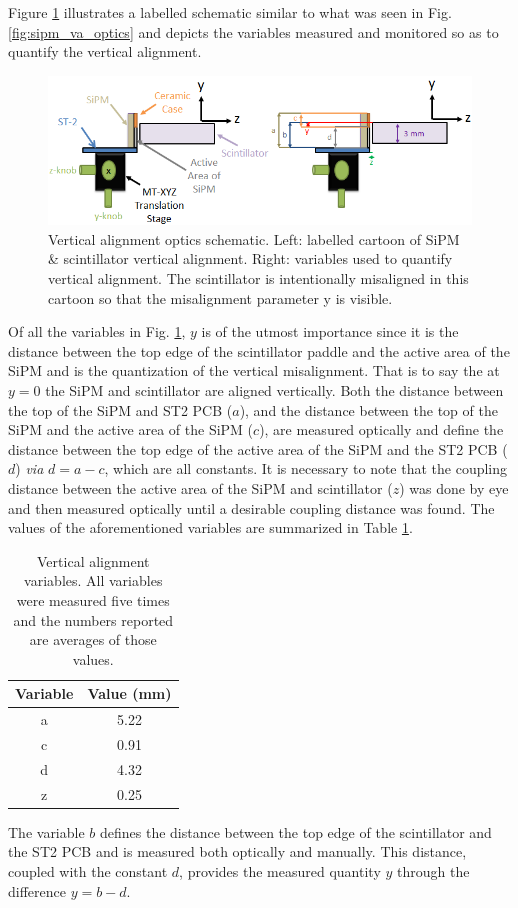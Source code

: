 Figure \ref{fig:sipm_va_optics_schematic} illustrates a labelled schematic similar to what was seen in Fig. \ref{fig:sipm_va_optics} and depicts the variables measured and monitored so as to quantify the vertical alignment.
\begin{figure}[!htb]
	\centering
	\includegraphics[width=1.0\columnwidth]{misalignment/figs/sipm_va_optics_schematic}
	\caption{Vertical alignment optics schematic.  Left: labelled cartoon of SiPM \& scintillator vertical alignment.  Right: variables used to quantify vertical alignment.  The scintillator is intentionally misaligned in this cartoon so that the misalignment parameter y is visible.}
	\label{fig:sipm_va_optics_schematic}
\end{figure}
Of all the variables in Fig. \ref{fig:sipm_va_optics_schematic}, $y$ is of the utmost importance since it is the distance between the top edge of the scintillator paddle and the active area of the SiPM and is the quantization of the vertical misalignment.  That is to say the at $y = 0$ the SiPM and scintillator are aligned vertically.  Both the distance between the top of the SiPM and ST2 PCB ($a$), and the distance between the top of the SiPM and the active area of the SiPM ($c$), are measured optically and define the distance between the top edge of the active area of the SiPM and the ST2 PCB ($d$) \textit{via} $d = a - c$, which are all constants. It is necessary to note that the coupling distance between the active area of the SiPM and scintillator ($z$) was done by eye and then measured optically until a desirable coupling distance was found.  The values of the aforementioned variables are summarized in Table \ref{tab:va_vars}.
\begin{table}[!htb]
	\centering
	\begin{tabular}{|c|c|}
		\hline \textbf{Variable} & \textbf{Value (mm)} \\ 
		\hline a & 5.22 \\ 
		\hline c & 0.91 \\ 
		\hline d & 4.32 \\ 
		\hline z & 0.25 \\ 
		\hline 
	\end{tabular} 
	\caption[Vertical alignment variables]{Vertical alignment variables.  All variables were measured five times and the numbers reported are averages of those values.}
	\label{tab:va_vars}
\end{table}
The variable $b$ defines the distance between the top edge of the scintillator and the ST2 PCB and is measured both optically and manually.  This distance, coupled with the constant $d$, provides the measured quantity $y$ through the difference $y = b - d$.

